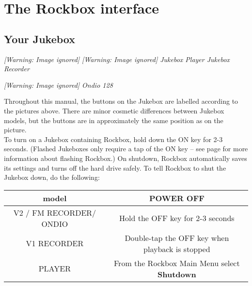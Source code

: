 \chapter{\label{ref:PARTII}The Rockbox interface}
\clearpage
\section{Your Jukebox}
\begin{minipage}{16.554cm}
{\centering\itshape
  [Warning: Image ignored] %
   [Warning: Image ignored] %
 \newline
Jukebox Player  Jukebox Recorder
\par}

{\centering\itshape
  [Warning: Image ignored] %
 \newline
Ondio 128
\par}
\end{minipage}

Throughout this manual, the buttons on the Jukebox are labelled
according to the pictures above.  There are minor cosmetic differences
between Jukebox models, but the buttons are in approximately the same
position as on the picture.\\

To turn on a Jukebox containing Rockbox, hold down the ON key
for 2{}-3 seconds.  (Flashed Jukeboxes only require a tap of the ON key
{--} see page \textup{\pageref{ref:FlashingRockboxReal}} for more
information about flashing Rockbox.) 
\label{ref:Safeshutdown}On shutdown, Rockbox automatically saves its settings and turns off the hard drive safely. To tell Rockbox to shut the Jukebox down, do the following:


\begin{table}[h!]
  \begin{center}
    \begin{tabular}{|c|c|}
      \hline
      model & POWER OFF \\\hline
      V2 / FM RECORDER/ ONDIO & Hold  the OFF key for 2{}-3 seconds \\\hline
      V1 RECORDER & Double{}-tap the OFF key when playback is stopped \\\hline
      PLAYER & From the Rockbox Main Menu select \textbf{Shutdown} \\\hline
    \end{tabular}
  \end{center}
\end{table}

